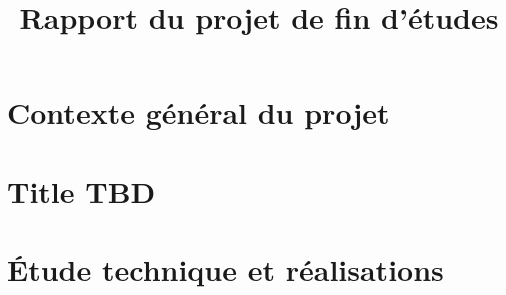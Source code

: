 \documentclass[a4paper, french, 12pt]{report}
\title{Rapport du projet de fin d'études}\let\title\@title
\begin{document}
\begin{titlepage}
  
\end{titlepage}


\ClearShipoutPicture
\newpage









\tableofcontents
\listoftables
\listoffigures



\fancyhead{}
\fancyfoot{}
\fancyfoot[LE,RO]{\thepage}


\part{Contexte général du projet}

\part{Title TBD}

\part{Étude technique et réalisations}

\end{document}
